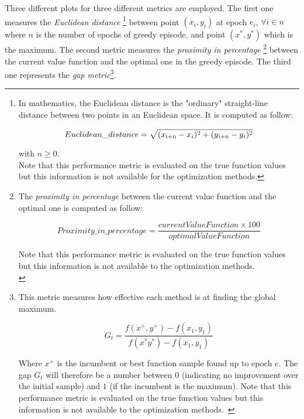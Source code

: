 Three different plots for three different metrics are employed. The first one measures the \textit{Euclidean distance} \footnote{In mathematics, the Euclidean distance is the "ordinary" straight-line distance between two points in an Euclidean space. It is computed as follow: 
	
	\begin{equation}
		Euclidean\_distance = \sqrt{(x\textsubscript{i+n} - x_i)^2 + (y\textsubscript{i+n} - y_i)^2}
	\end{equation}

with $n \ge 0$. \\
	
Note that this performance metric is evaluated on the true function values but this information is not available for the optimization methods.} between point $(x_i, y_i)$ at epoch $e_i$, $\forall i \in n$ where $n$ is the number of epochs of greedy episode, and point $(x^*, y^*)$ which is the maximum. The second metric measures the \textit{proximity in percentage} \footnote{The \textit{proximity in percentage} between the current value function and the optimal one is computed as follow:

\begin{equation}
Proximity\_in\_ percentage = \frac{currentValueFunction \times 100}{optimalValueFunction}
\end{equation}

Note that this performance metric is evaluated on the true function values but this information is not available to the optimization methods. \\ } between the current value function and the optimal one in the greedy episode. The third one represents the \textit{gap metric}\footnote{This metric measures how effective each method is at finding the global maximum.

\begin{equation}
G_t = \dfrac{f(x^+, y^+) - f(x_1, y_1)}{f(x^* y^*) - f(x_1, y_1)}
\end{equation}

Where $x^+$ is the incumbent or best function sample found up to epoch $e$. The gap $G_t$ will therefore be a number between $0$ (indicating no improvement over the initial sample) and $1$ (if the incumbent is the maximum). Note that this performance metric is evaluated on the true function values but this information is not available to the optimization methods.~\cite{Hoffman:2011:PAB:3020548.3020587}}.



